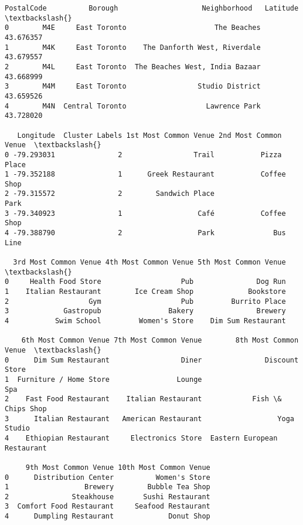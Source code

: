 \documentclass[11pt]{article}
\makeatletter
\newcommand{\boxspacing}{\kern\kvtcb@left@rule\kern\kvtcb@boxsep}
\newcommand{\prompt}[4]{
        \ttfamily\llap{{\color{#2}[#3]:\hspace{3pt}#4}}\vspace{-\baselineskip}
    }
\makeatother
\begin{document}
            \begin{tcolorbox}[breakable, size=fbox, boxrule=.5pt, pad at break*=1mm, opacityfill=0]
\prompt{Out}{outcolor}{43}{\boxspacing}
\begin{Verbatim}[commandchars=\\\{\}]
  PostalCode          Borough                    Neighborhood   Latitude  \textbackslash{}
0        M4E     East Toronto                     The Beaches  43.676357
1        M4K     East Toronto    The Danforth West, Riverdale  43.679557
2        M4L     East Toronto  The Beaches West, India Bazaar  43.668999
3        M4M     East Toronto                 Studio District  43.659526
4        M4N  Central Toronto                   Lawrence Park  43.728020

   Longitude  Cluster Labels 1st Most Common Venue 2nd Most Common Venue  \textbackslash{}
0 -79.293031               2                 Trail           Pizza Place
1 -79.352188               1      Greek Restaurant           Coffee Shop
2 -79.315572               2        Sandwich Place                  Park
3 -79.340923               1                  Café           Coffee Shop
4 -79.388790               2                  Park              Bus Line

  3rd Most Common Venue 4th Most Common Venue 5th Most Common Venue  \textbackslash{}
0     Health Food Store                   Pub               Dog Run
1    Italian Restaurant        Ice Cream Shop             Bookstore
2                   Gym                   Pub         Burrito Place
3             Gastropub                Bakery               Brewery
4           Swim School         Women's Store    Dim Sum Restaurant

    6th Most Common Venue 7th Most Common Venue        8th Most Common Venue  \textbackslash{}
0      Dim Sum Restaurant                 Diner               Discount Store
1  Furniture / Home Store                Lounge                          Spa
2    Fast Food Restaurant    Italian Restaurant            Fish \& Chips Shop
3      Italian Restaurant   American Restaurant                  Yoga Studio
4    Ethiopian Restaurant     Electronics Store  Eastern European Restaurant

     9th Most Common Venue 10th Most Common Venue
0      Distribution Center          Women's Store
1                  Brewery        Bubble Tea Shop
2               Steakhouse       Sushi Restaurant
3  Comfort Food Restaurant     Seafood Restaurant
4      Dumpling Restaurant             Donut Shop
\end{Verbatim}
\end{tcolorbox}
        
\end{document}
